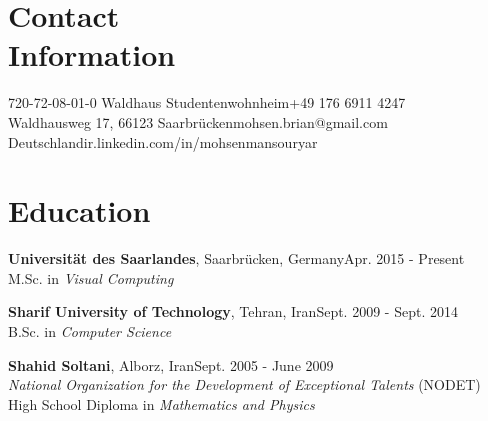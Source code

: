 \documentclass[margin,line]{resume}
\begin{document}
\begin{resume}


    \section{\mysidestyle Contact\\Information}\vspace{2mm}
	720-72-08-01-0 Waldhaus Studentenwohnheim\hfill{+49 176 6911 4247}\\
    Waldhausweg 17, 66123 Saarbr{\"u}cken\hfill{mohsen.brian@gmail.com}\\
    Deutschland\hfill{ir.linkedin.com/in/mohsenmansouryar}
    

    \section{\mysidestyle Education}

	{\bf Universit{\"a}t des Saarlandes}, Saarbr{\"u}cken, Germany\hfill {\sf Apr. 2015 - Present}\vspace{1mm}\\
	M.Sc. in {\sl Visual Computing}

    {\bf Sharif University  of Technology}, Tehran, Iran\hfill {\sf Sept. 2009 - Sept. 2014}\vspace{1mm}\\
	B.Sc. in {\sl Computer Science}
    
    {\bf Shahid Soltani}, Alborz, Iran\hfill {\sf Sept. 2005 - June 2009}\vspace{1mm}\\
    {\sl National Organization for the Development of Exceptional Talents} (NODET) \vspace{1mm}\\
    High School Diploma in {\sl Mathematics and Physics}


\end{resume}
\end{document}
